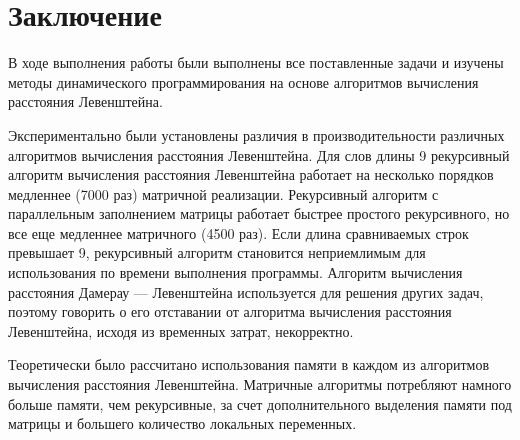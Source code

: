 \chapter*{Заключение}

В ходе выполнения работы были выполнены все поставленные задачи и изучены методы динамического программирования на основе алгоритмов вычисления расстояния Левенштейна.

Экспериментально были установлены различия в производительности различных алгоритмов вычисления расстояния Левенштейна. Для слов длины 9 рекурсивный алгоритм вычисления расстояния Левенштейна работает на несколько порядков медленнее (7000 раз) матричной реализации. Рекурсивный алгоритм с параллельным заполнением матрицы работает быстрее простого рекурсивного, но все еще медленнее матричного (4500 раз). Если длина сравниваемых строк превышает 9, рекурсивный алгоритм становится неприемлимым для использования по времени выполнения программы. Алгоритм вычисления расстояния Дамерау — Левенштейна используется для решения других задач, поэтому говорить о его отставании от алгоритма вычисления расстояния Левенштейна, исходя из временных затрат, некорректно.

Теоретически было рассчитано использования памяти в каждом из алгоритмов вычисления расстояния Левенштейна. Матричные алгоритмы потребляют намного больше памяти, чем рекурсивные, за счет дополнительного выделения памяти под матрицы и большего количество локальных переменных.